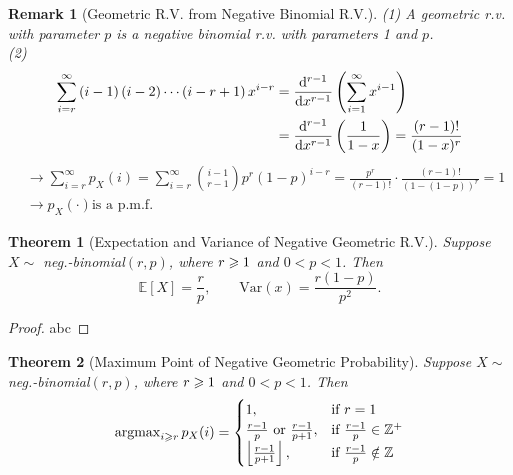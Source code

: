 \documentclass[openany,12pt]{book}
\newtheorem{theorem}{Theorem}[chapter]
\newtheorem{remark}{Remark}[chapter]
\begin{document}
\begin{remark}[Geometric R.V. from Negative Binomial R.V.]
  (1) A geometric r.v. with parameter $p$ is a negative binomial r.v. with parameters 1 and $p$.\\
  (2)
  $$
    \begin{aligned}
      \sum_{i=r}^{\infty}\left(i-1\right)\left(i-2\right)\cdots\left(i-r+1\right)x^{i-r} & =\frac{\mathrm{d}^{r-1}}{\mathrm{d} x^{r-1}}\left(\sum_{i=1}^{\infty}x^{i-1}\right)                      \\
                                                                                         & =\frac{\mathrm{d}^{r-1}}{\mathrm{d} x^{r-1}}\left(\frac{1}{1-x}\right)=\frac{\left(r-1\right)!}{(1-x)^r} \\
    \end{aligned}
  $$
  $$
    \begin{aligned}
       & \to\sum_{i=r}^{\infty}{p_X(i)}=\sum_{i=r}^{\infty}{\binom{i-1}{r-1}p^r(1-p)^{i-r}}=\frac{p^r}{\left(r-1\right)!}\cdot\frac{\left(r-1\right)!}{(1-(1-p))^r}=1 \\
       & \to p_X\left(\cdot\right) \text{is a p.m.f.}
    \end{aligned}
  $$
\end{remark}

\begin{theorem}[Expectation and Variance of Negative Geometric R.V.]
  Suppose $X\sim$ neg.-binomial$(r,p)$, where $r\geqslant1$ and $0<p<1$. Then
  $$
    \mathbb{E}\left[X\right]=\frac{r}{p},\qquad
    \mathrm{Var}(x)=\frac{r(1-p)}{p^2}.
  $$
\end{theorem}

\begin{proof}
  abc
\end{proof}

\begin{theorem}[Maximum Point of Negative Geometric Probability]
  Suppose $X\sim$ neg.-binomial$(r,p)$, where $r\geqslant1$ and $0<p<1$. Then
  \begin{equation}
    \operatorname{argmax}_{i\geqslant r} p_X(i)=
    \begin{cases}
      1,                                        & \text{if}~r=1                    \\
      \frac{r-1}{p}~\text{or}~\frac{r-1}{p+1},  & \text{if}~\frac{r-1}{p}\in\mathbb{Z}^+  \\
      \left\lfloor\frac{r-1}{p+1}\right\rfloor, & \text{if}~\frac{r-1}{p}\notin\mathbb{Z}
    \end{cases}
  \end{equation}
\end{theorem}
\end{document}
